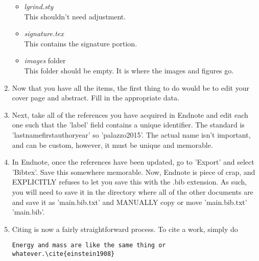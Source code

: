\documentclass[11pt]{amsart}
\begin{document}
\begin{enumerate}
\begin{itemize}
\item \textit{lgrind.sty}\\
This shouldn't need adjustment. 
\item \textit{signature.tex}\\
This contains the signature portion. 
\item \textit{images} folder\\
This folder should be empty. It is where the images and figures go.
\end{itemize}
\item Now that you have all the items, the first thing to do would be to edit your cover page and abstract. Fill in the appropriate data. 
\item Next, take all of the references you have acquired in Endnote and edit each one such that the 'label' field contains a unique identifier. The standard is 'lastnamefirstauthoryear' so 'palazzo2015'. The actual name isn't important, and can be custom, however, it must be unique and memorable.
\item In Endnote, once the references have been updated, go to 'Export' and select 'Bibtex'. Save this somewhere memorable. Now, Endnote is piece of crap, and EXPLICITLY refuses to let you save this with the .bib extension. As such, you will need to save it in the directory where all of the other documents are and save it as 'main.bib.txt' and MANUALLY copy or move 'main.bib.txt' 'main.bib'. 
\item Citing is now a fairly straightforward process. To cite a work, simply do

\begin{lstlisting}
Energy and mass are like the same thing or whatever.\cite{einstein1908}
\end{lstlisting}


\end{enumerate}
\end{document}
